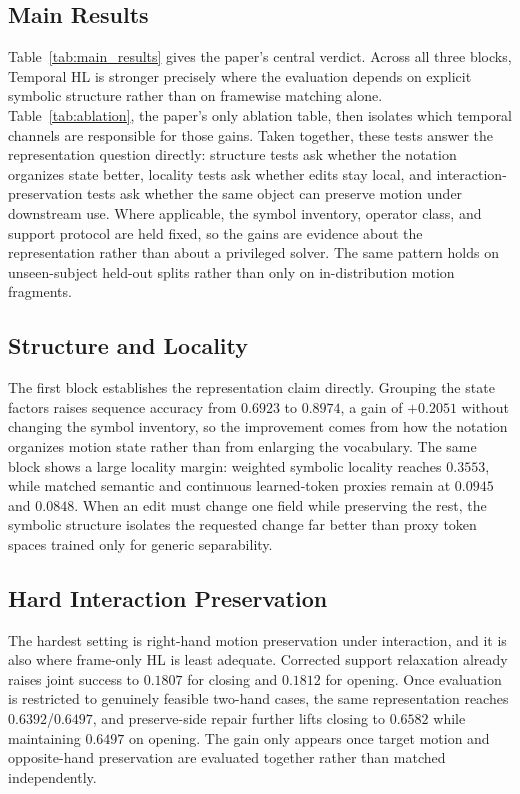 \documentclass[letterpaper]{article}
\newcommand{\thl}{Temporal HL}
\begin{document}
\subsection{Main Results}

Table~\ref{tab:main_results} gives the paper's central verdict. Across all three
blocks, \thl{} is stronger precisely where the evaluation depends on explicit
symbolic structure rather than on framewise matching alone.
Table~\ref{tab:ablation}, the paper's only ablation table, then isolates which
temporal channels are responsible for those gains.
Taken together, these tests answer the representation question directly:
structure tests ask whether the notation organizes state better, locality tests
ask whether edits stay local, and interaction-preservation tests ask whether the
same object can preserve motion under downstream use.
Where applicable, the symbol inventory, operator class, and support protocol
are held fixed, so the gains are evidence about the representation rather than
about a privileged solver. The same pattern holds on unseen-subject held-out
splits rather than only on in-distribution motion fragments.

\subsection{Structure and Locality}

The first block establishes the representation claim directly. Grouping the
state factors raises sequence accuracy from $0.6923$ to $0.8974$, a gain of
$+0.2051$ without changing the symbol inventory, so the improvement comes from
how the notation organizes motion state rather than from enlarging the
vocabulary. The same block shows a large locality margin: weighted symbolic
locality reaches $0.3553$, while matched semantic and continuous learned-token
proxies remain at $0.0945$ and $0.0848$. When an edit must change one field
while preserving the rest, the symbolic structure isolates the requested change
far better than proxy token spaces trained only for generic separability.

\subsection{Hard Interaction Preservation}

The hardest setting is right-hand motion preservation under interaction, and it
is also where frame-only HL is least adequate. Corrected support relaxation
already raises joint success to $0.1807$ for closing and $0.1812$ for opening.
Once evaluation is restricted to genuinely feasible two-hand cases, the same
representation reaches $0.6392$/$0.6497$, and preserve-side repair further
lifts closing to $0.6582$ while maintaining $0.6497$ on opening. The gain only
appears once target motion and opposite-hand preservation are evaluated
together rather than matched independently.
\end{document}
